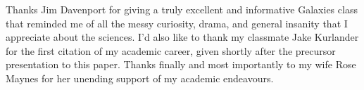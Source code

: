 \documentclass[preprint2]{aastex631}
\begin{document}
\begin{acknowledgements}
Thanks Jim Davenport for giving a truly excellent and informative Galaxies class that reminded me of all the messy curiosity, drama, and general insanity that I appreciate about the sciences. I'd also like to thank my classmate Jake Kurlander for the first citation of my academic career, given shortly after the precursor presentation to this paper. Thanks finally and most importantly to my wife Rose Maynes for her unending support of my academic endeavours.
\end{acknowledgements}



{}



\end{document}
